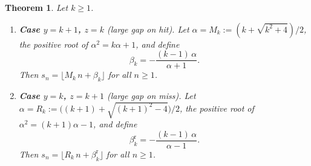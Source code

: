 \documentclass[11pt]{article}
\numberwithin{equation}{section}
\theoremstyle{plain}
\newtheorem{theorem}{Theorem}[section]
\theoremstyle{definition}
\theoremstyle{remark}
\begin{document}
\begin{theorem}\label{thm:metallic-beatty}
Let $k\ge1$.
\begin{enumerate}
\item[\textup{(a)}] \textbf{Case $y=k+1$, $z=k$}
  \textup{(large gap on hit).}
  Let $\alpha=M_k:=(k+\sqrt{k^2+4})/2$, the positive root of
  $\alpha^2=k\alpha+1$, and define
  \begin{equation}\label{eq:metallic-beta}
    \beta_k=-\frac{(k-1)\,\alpha}{\alpha+1}.
  \end{equation}
  Then $s_n=\lfloor M_k\,n+\beta_k\rfloor$ for all $n\ge1$.

\item[\textup{(b)}] \textbf{Case $y=k$, $z=k+1$}
  \textup{(large gap on miss).}
  Let $\alpha=R_k:=\bigl((k+1)+\sqrt{(k+1)^2-4}\bigr)/2$, the
  positive root of $\alpha^2=(k+1)\alpha-1$, and define
  \begin{equation}\label{eq:reverse-beta}
    \beta_k^{\mathrm{r}}=-\frac{(k-1)\,\alpha}{\alpha-1}.
  \end{equation}
  Then $s_n=\lfloor R_k\,n+\beta_k^{\mathrm{r}}\rfloor$ for
  all $n\ge1$.
\end{enumerate}
\end{theorem}
\end{document}
